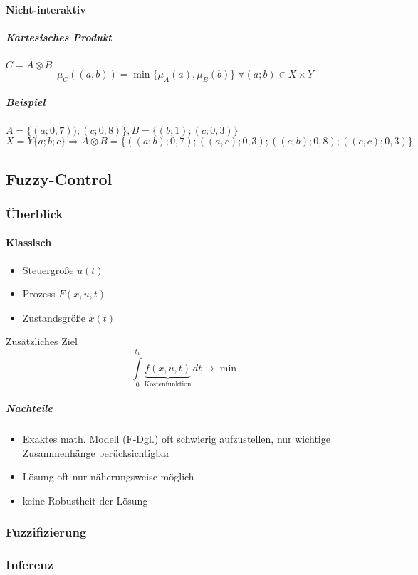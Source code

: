 \documentclass[a4paper]{scrartcl}
\begin{document}
\paragraph{Nicht-interaktiv}
\subparagraph{Kartesisches Produkt} $C = A \otimes B$\\
\[ \mu_C ((a,b)) = \min \{ \mu_A(a),\mu_B (b)\} \; \forall (a;b) \in X \times Y\]

\subparagraph{Beispiel} $A = \{ (a;0,7));(c;0,8)\}, B= \{(b;1);(c;0,3)\}$\\
$X = Y \{a;b;c\} \Rightarrow A \otimes B = \{((a;b);0,7);((a,c);0,3);((c;b);0,8);((c,c);0,3)\}$

\subsection{Fuzzy-Control}
\subsubsection{Überblick}
\paragraph{Klassisch}
\begin{itemize}
\item Steuergröße $u(t)$
\item Prozess $F(x,u,t)$
\item Zustandsgröße $x(t)$
\end{itemize}
Zusätzliches Ziel
\[ \int\limits_0^{t_1} \underbrace{f(x,u,t)}_{\text{Kostenfunktion}} \, dt \rightarrow \min\]

\subparagraph{Nachteile}
\begin{itemize}
\item Exaktes math. Modell (F-Dgl.) oft schwierig aufzustellen, nur wichtige Zusammenhänge berücksichtigbar
\item Lösung oft nur näherungsweise möglich
\item keine Robustheit der Lösung
\end{itemize}

\subsubsection{Fuzzifizierung}
\subsubsection{Inferenz}
\end{document}

